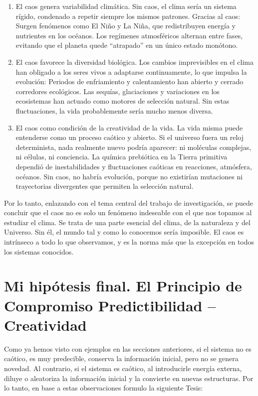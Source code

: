 \documentclass[
  10pt,
  a4paper,
  DIV=11,
  numbers=noendperiod,
  open=any]{scrreprt}
\numberwithin{equation}{chapter}
\numberwithin{equation}{section}
\renewcommand{\[}{\begin{equation}}
\renewcommand{\]}{\end{equation}}
\begin{document}
\begin{enumerate}
\def\labelenumi{\arabic{enumi}.}
\item
  El caos genera variabilidad climática. Sin caos, el clima sería un
  sistema rígido, condenado a repetir siempre los mismos patrones.
  Gracias al caos: Surgen fenómenos como El Niño y La Niña, que
  redistribuyen energía y nutrientes en los océanos. Los regímenes
  atmosféricos alternan entre fases, evitando que el planeta quede
  ``atrapado'' en un único estado monótono.
\item
  El caos favorece la diversidad biológica. Los cambios imprevisibles en
  el clima han obligado a los seres vivos a adaptarse continuamente, lo
  que impulsa la evolución: Periodos de enfriamiento y calentamiento han
  abierto y cerrado corredores ecológicos. Las sequías, glaciaciones y
  variaciones en los ecosistemas han actuado como motores de selección
  natural. Sin estas fluctuaciones, la vida probablemente sería mucho
  menos diversa.
\item
  El caos como condición de la creatividad de la vida. La vida misma
  puede entenderse como un proceso caótico y abierto. Si el universo
  fuera un reloj determinista, nada realmente nuevo podría aparecer: ni
  moléculas complejas, ni células, ni conciencia. La química prebiótica
  en la Tierra primitiva dependió de inestabilidades y fluctuaciones
  caóticas en reacciones, atmósfera, océanos. Sin caos, no habría
  evolución, porque no existirían mutaciones ni trayectorias divergentes
  que permiten la selección natural.
\end{enumerate}

Por lo tanto, enlazando con el tema central del trabajo de
investigación, se puede concluir que el caos no es solo un fenómeno
indeseable con el que nos topamos al estudiar el clima. Se trata de una
parte esencial del clima, de la naturaleza y del Universo. Sin él, el
mundo tal y como lo conocemos sería imposible. El caos es intrínseco a
todo lo que observamos, y es la norma más que la excepción en todos los
sistemas conocidos.

\chapter{Mi hipótesis final. El Principio de Compromiso Predictibilidad
--
Creatividad}\label{mi-hipuxf3tesis-final.-el-principio-de-compromiso-predictibilidad-creatividad}

Como ya hemos visto con ejemplos en las secciones anteriores, si el
sistema no es caótico, es muy predecible, conserva la información
inicial, pero no se genera novedad. Al contrario, si el sistema es
caótico, al introducirle energía externa, diluye o aleatoriza la
información inicial y la convierte en nuevas estructuras. Por lo tanto,
en base a estas observaciones formulo la siguiente Tesis:
\end{document}
